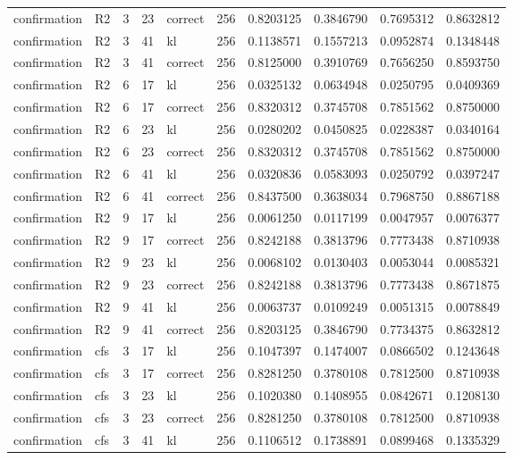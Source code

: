 \begin{tabular}{llrrlrrrrr}
confirmation & R2 & 3 & 23 & correct & 256 & 0.8203125 & 0.3846790 & 0.7695312 & 0.8632812 \\
confirmation & R2 & 3 & 41 & kl & 256 & 0.1138571 & 0.1557213 & 0.0952874 & 0.1348448 \\
confirmation & R2 & 3 & 41 & correct & 256 & 0.8125000 & 0.3910769 & 0.7656250 & 0.8593750 \\
confirmation & R2 & 6 & 17 & kl & 256 & 0.0325132 & 0.0634948 & 0.0250795 & 0.0409369 \\
confirmation & R2 & 6 & 17 & correct & 256 & 0.8320312 & 0.3745708 & 0.7851562 & 0.8750000 \\
confirmation & R2 & 6 & 23 & kl & 256 & 0.0280202 & 0.0450825 & 0.0228387 & 0.0340164 \\
confirmation & R2 & 6 & 23 & correct & 256 & 0.8320312 & 0.3745708 & 0.7851562 & 0.8750000 \\
confirmation & R2 & 6 & 41 & kl & 256 & 0.0320836 & 0.0583093 & 0.0250792 & 0.0397247 \\
confirmation & R2 & 6 & 41 & correct & 256 & 0.8437500 & 0.3638034 & 0.7968750 & 0.8867188 \\
confirmation & R2 & 9 & 17 & kl & 256 & 0.0061250 & 0.0117199 & 0.0047957 & 0.0076377 \\
confirmation & R2 & 9 & 17 & correct & 256 & 0.8242188 & 0.3813796 & 0.7773438 & 0.8710938 \\
confirmation & R2 & 9 & 23 & kl & 256 & 0.0068102 & 0.0130403 & 0.0053044 & 0.0085321 \\
confirmation & R2 & 9 & 23 & correct & 256 & 0.8242188 & 0.3813796 & 0.7773438 & 0.8671875 \\
confirmation & R2 & 9 & 41 & kl & 256 & 0.0063737 & 0.0109249 & 0.0051315 & 0.0078849 \\
confirmation & R2 & 9 & 41 & correct & 256 & 0.8203125 & 0.3846790 & 0.7734375 & 0.8632812 \\
confirmation & cfs & 3 & 17 & kl & 256 & 0.1047397 & 0.1474007 & 0.0866502 & 0.1243648 \\
confirmation & cfs & 3 & 17 & correct & 256 & 0.8281250 & 0.3780108 & 0.7812500 & 0.8710938 \\
confirmation & cfs & 3 & 23 & kl & 256 & 0.1020380 & 0.1408955 & 0.0842671 & 0.1208130 \\
confirmation & cfs & 3 & 23 & correct & 256 & 0.8281250 & 0.3780108 & 0.7812500 & 0.8710938 \\
confirmation & cfs & 3 & 41 & kl & 256 & 0.1106512 & 0.1738891 & 0.0899468 & 0.1335329 \\

\end{tabular}
